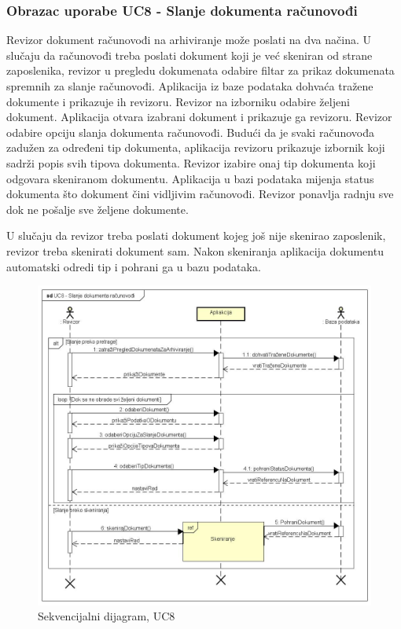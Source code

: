 				\subsubsection{Obrazac uporabe UC8 - Slanje dokumenta računovođi}
				Revizor dokument računovođi na arhiviranje može poslati na dva načina. U slučaju da računovođi treba poslati dokument koji je već skeniran od strane zaposlenika, revizor u pregledu dokumenata odabire filtar za prikaz dokumenata spremnih za slanje računovođi. Aplikacija iz baze podataka dohvaća tražene dokumente i prikazuje ih revizoru. Revizor na izborniku odabire željeni dokument. Aplikacija otvara izabrani dokument i prikazuje ga revizoru. Revizor odabire opciju slanja dokumenta računovođi. Budući da je svaki računovođa zadužen za određeni tip dokumenta, aplikacija revizoru prikazuje izbornik koji sadrži popis svih tipova dokumenta. Revizor izabire onaj tip dokumenta koji odgovara skeniranom dokumentu. Aplikacija u bazi podataka mijenja status dokumenta što dokument čini vidljivim računovođi. Revizor ponavlja radnju sve dok ne pošalje sve željene dokumente. \par U slučaju da revizor treba poslati dokument kojeg još nije skenirao zaposlenik, revizor treba skenirati dokument sam. Nakon skeniranja aplikacija dokumentu automatski odredi tip i pohrani ga u bazu podataka.
				\begin{figure}[H]		
					\includegraphics[scale=0.35]{slike/UC8 - Slanje dokumenta računovođi} %
					\centering
					\caption{ Sekvencijalni dijagram, UC8}
					\label{fig:promjene}
				\end{figure}

